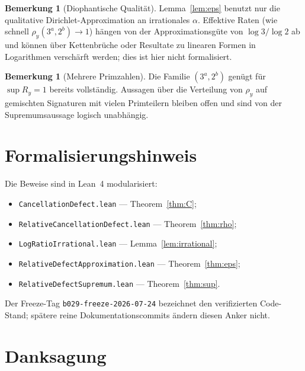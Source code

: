 \documentclass[11pt,a4paper]{article}
\theoremstyle{definition}
\newtheorem{remark}[theorem]{Bemerkung}
\newcommand{\rhoy}{\rho_y}
\newcommand{\Ry}{R_y}
\begin{document}
	\begin{remark}[Diophantische Qualit{\"a}t]
		Lemma~\ref{lem:eps} benutzt nur die qualitative Dirichlet-Approximation
		an irrationales $\alpha$.
		Effektive Raten (wie schnell $\rhoy(3^a,2^b)\to 1$) h{\"a}ngen von der
		Approximationsg{\"u}te von $\log 3/\log 2$ ab und k{\"o}nnen {\"u}ber
		Kettenbr{\"u}che oder Resultate zu linearen Formen in Logarithmen
		versch{\"a}rft werden; dies ist hier nicht formalisiert.
	\end{remark}
	
	\begin{remark}[Mehrere Primzahlen]
		Die Familie $(3^a,2^b)$ gen{\"u}gt f{\"u}r $\sup\Ry=1$ bereits vollst{\"a}ndig.
		Aussagen {\"u}ber die Verteilung von $\rhoy$ auf gemischten Signaturen mit
		vielen Primteilern bleiben offen und sind von der Supremumsaussage logisch
		unabh{\"a}ngig.
	\end{remark}
	
	\section{Formalisierungshinweis}
	\label{sec:lean}
	
	Die Beweise sind in Lean~4 modularisiert:
	\begin{itemize}[leftmargin=1.5em]
		\item \texttt{CancellationDefect.lean} --- Theorem~\ref{thm:C};
		\item \texttt{RelativeCancellationDefect.lean} --- Theorem~\ref{thm:rho};
		\item \texttt{LogRatioIrrational.lean} --- Lemma~\ref{lem:irrational};
		\item \texttt{RelativeDefectApproximation.lean} --- Theorem~\ref{thm:eps};
		\item \texttt{RelativeDefectSupremum.lean} --- Theorem~\ref{thm:sup}.
	\end{itemize}
	Der Freeze-Tag \texttt{b029-freeze-2026-07-24} bezeichnet den verifizierten
	Code-Stand; sp{\"a}tere reine Dokumentationscommits {\"a}ndern diesen Anker nicht.
	
	\section*{Danksagung}
	
\end{document}
